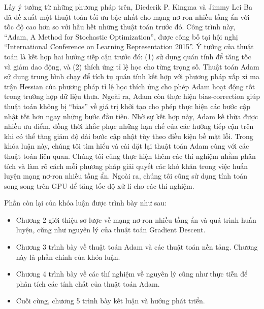 Lấy ý tưởng từ những phương pháp trên, Diederik P. Kingma và Jimmy Lei Ba đã đề xuất một thuật toán tối ưu bậc nhất cho mạng nơ-ron nhiều tầng ẩn với tốc độ cao hơn so với hầu hết những thuật toán trước đó\cite{kingma2014adam}. Công trình này, ``Adam, A Method for Stochastic Optimization'', được công bố tại hội nghị ``International Conference on Learning Representation 2015''. Ý tưởng của thuật toán là kết hợp hai hướng tiếp cận trước đó: (1) sử dụng quán tính để tăng tốc và giảm dao động, và (2) thích ứng tỉ lệ học cho từng trọng số. Thuật toán Adam sử dụng trung bình chạy để tích tụ quán tính kết hợp với phương pháp xấp xỉ ma trận Hessian của phương pháp tỉ lệ học thích ứng cho phép Adam hoạt động tốt trong trường hợp dữ liệu thưa. Ngoài ra, Adam còn thực hiện bias-correction giúp thuật toán không bị ``bias'' về giá trị khởi tạo cho phép thực hiện các bước cập nhật tốt hơn ngay những bước đầu tiên. Nhờ sự kết hợp này, Adam kế thừa được nhiều ưu điểm, đồng thời khắc phục những hạn chế của các hướng tiếp cận trên khi có thể tăng giảm độ dài bước cập nhật tùy theo điều kiện bề mặt lỗi. Trong khóa luận này, chúng tôi tìm hiểu và cài đặt lại thuật toán Adam cùng với các thuật toán liên quan. Chúng tôi cũng thực hiện thêm các thí nghiệm nhằm phân tích và làm rõ cách mỗi phương pháp giải quyết các khó khăn trong việc huấn luyện mạng nơ-ron nhiều tầng ẩn. Ngoài ra, chúng tôi cũng sử dụng tính toán song song trên GPU để tăng tốc độ xử lí cho các thí nghiệm.

Phần còn lại của khóa luận được trình bày như sau:

\begin{itemize}
	\item Chương 2 giới thiệu sơ lược về mạng nơ-ron nhiều tầng ẩn và quá trình huấn luyện, cũng như nguyên lý của thuật toán Gradient Descent.
	\item Chương 3 trình bày về thuật toán Adam và các thuật toán nền tảng. Chương này là phần chính của khóa luận.
	\item Chương 4 trình bày về các thí nghiệm về nguyên lý cũng như thực tiễn để phân tích các tính chất của thuật toán Adam.
	\item Cuối cùng, chương 5 trình bày kết luận và hướng phát triển.
\end{itemize}
